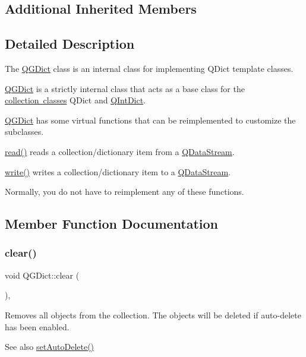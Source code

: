 \subsection*{Additional Inherited Members}


\subsection{Detailed Description}
The \mbox{\hyperlink{class_q_g_dict}{Q\+G\+Dict}} class is an internal class for implementing Q\+Dict template classes. 

\mbox{\hyperlink{class_q_g_dict}{Q\+G\+Dict}} is a strictly internal class that acts as a base class for the \mbox{\hyperlink{}{collection classes}} Q\+Dict and \mbox{\hyperlink{class_q_int_dict}{Q\+Int\+Dict}}.

\mbox{\hyperlink{class_q_g_dict}{Q\+G\+Dict}} has some virtual functions that can be reimplemented to customize the subclasses. 
\begin{DoxyItemize}
\item \mbox{\hyperlink{structcmd_8h_a9c7b76d5266903891c803132d51ccb90}{read()}} reads a collection/dictionary item from a \mbox{\hyperlink{class_q_data_stream}{Q\+Data\+Stream}}. 
\item \mbox{\hyperlink{structcmd_8h_af2a3ea719b83f672637febdd87c36c36}{write()}} writes a collection/dictionary item to a \mbox{\hyperlink{class_q_data_stream}{Q\+Data\+Stream}}. 
\end{DoxyItemize}Normally, you do not have to reimplement any of these functions. 

\subsection{Member Function Documentation}
\mbox{\label{class_q_g_dict_a991443b3568622b97772e234fe61dfd7}} 
\subsubsection{\texorpdfstring{clear()}{clear()}}
{\footnotesize\ttfamily void Q\+G\+Dict\+::clear (\begin{DoxyParamCaption}{ }\end{DoxyParamCaption})\hspace{0.3cm}{\ttfamily [protected]}, {\ttfamily [virtual]}}

Removes all objects from the collection. The objects will be deleted if auto-\/delete has been enabled. \begin{DoxySeeAlso}{See also}
\mbox{\hyperlink{class_q_collection_a6ed41913c76bfba54be6da26015ee3f3}{set\+Auto\+Delete()}} 
\end{DoxySeeAlso}


